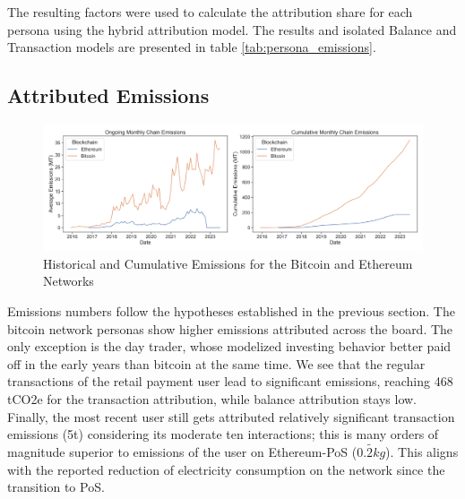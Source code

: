 \documentclass[11pt]{report}
\begin{document}
The resulting factors were used to calculate the attribution share for each persona using the hybrid attribution model. The results and isolated Balance and Transaction models are presented in table \ref{tab:persona_emissions}.

\subsection{Attributed Emissions}




\begin{figure}[h!]
    \centering
    \centerline{\includegraphics[scale=0.4]{figures/ongoing_cumulative_emissions.png}}
    \caption{Historical and Cumulative Emissions for the Bitcoin and Ethereum Networks}
    \label{fig:ongoing_emissions}
\end{figure}

Emissions numbers follow the hypotheses established in the previous section. The bitcoin network personas show higher emissions attributed across the board. The only exception is the day trader, whose modelized investing behavior better paid off in the early years than bitcoin at the same time. We see that the regular transactions of the retail payment user lead to significant emissions, reaching 468 tCO2e for the transaction attribution, while balance attribution stays low. Finally, the most recent user still gets attributed relatively significant transaction emissions (5t) considering its moderate ten interactions; this is many orders of magnitude superior to emissions of the user on Ethereum-PoS ($\tilde{0.2kg}$). This aligns with the reported reduction of electricity consumption on the network since the transition to PoS.
\end{document}
